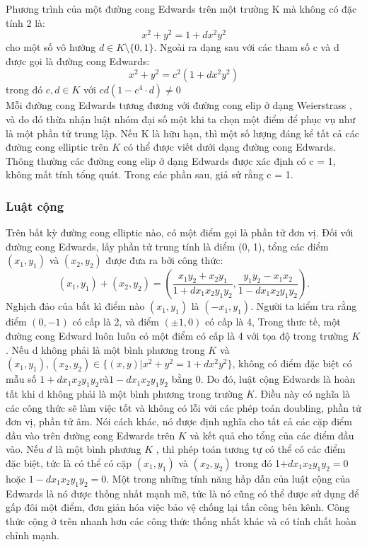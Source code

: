 \documentclass[a4paper,12pt]{report}
\begin{document}
Phương trình của một đường cong Edwards trên một trường K mà không có đặc tính 2 là:
\begin{displaymath}
x^{2}+y^{2}=1+dx^{2}y^{2}
\end{displaymath}
cho một số vô hướng  $d \in K \setminus \{0,1\}$. Ngoài ra dạng sau với các tham số c và d được gọi là đường cong Edwards:
\begin{displaymath}
x^2 + y^2 = c^2(1 + dx^2y^2)
\end{displaymath}
trong đó $c, d \in K$ với $cd(1 - c^4\cdot d) \neq 0$ \\
Mỗi đường cong Edwards tương đương với đường cong elip ở dạng Weierstrass , và do đó thừa nhận luật nhóm đại số một khi ta chọn một điểm để phục vụ như là một phần tử trung lập. Nếu K là hữu hạn, thì một số lượng đáng kể tất cả các đường cong elliptic trên $K$ có thể được viết dưới dạng đường cong Edwards. Thông thường các đường cong elip ở dạng Edwards được xác định có c = 1, không mất tính tổng quát. Trong các phần sau, giả sử rằng c = 1.
\subsubsection{Luật cộng}
Trên bất kỳ đường cong elliptic nào, có một điểm gọi là phần tử đơn vị. Đối với đường cong Edwards, lấy phần tử trung tính là điểm (0, 1), tổng các điểm $(x_1,  y_1)$ và $(x_2 ,y_2)$ được đưa ra bởi công thức:
\begin{displaymath}
(x_1, y_1) + (x_2, y_2) = \left( \frac{x_1y_2 + x_2y_1}{1 + dx_1x_2y_1y_2}, \frac{y_1y_2 - x_1x_2}{1 - dx_1x_2y_1y_2} \right).
\end{displaymath}
Nghịch đảo của bất kì điểm nào $(x_1, y_1)$ là $(-x_1, y_1)$. Người ta kiểm tra rằng điểm $(0, -1)$ có cấp là 2, và điểm $(\pm 1, 0)$ có cấp là 4, Trong thưc tế, một đường cong Edward luôn luôn có một điểm có cấp là 4 với tọa độ trong trường $K$.
Nếu d không phải là một bình phương trong $K$ và $\displaystyle (x_{1}, y_{1}), (x_{2}, y_{2}) \in \{(x, y)|x^{2} + y^{2} = 1 + dx^{2}y^{2} \}$, không có điểm đặc biệt có mẫu số $1 +  dx_1x_2y_1y_2 và 1 -  dx_1 x_2y_1y_2$ bằng 0. Do đó, luật cộng Edwards là hoàn tất khi d không phải là một bình phương trong trường $K$. Điều này có nghĩa là các công thức sẽ làm việc tốt và không có lỗi với các phép toán doubling, phần tử đơn vị, phần tử âm. Nói cách khác, nó được định nghĩa cho tất cả các cặp điểm đầu vào trên đường cong Edwards trên $K$ và kết quả cho tổng của các điểm đầu vào.
Nếu $d$ là một bình phương $K$ , thì phép toán tương tự có thể có các điểm đặc biệt, tức là có thể có cặp $(x_1, y_1)$ và $(x_2, y_2)$ trong đó 1$ +  dx_1x_2y_1y_2 = 0$ hoặc $1 -  dx_1x_2y_1y_2 = 0$.
Một trong những tính năng hấp dẫn của luật cộng của Edwards là nó được thống nhất mạnh mẽ, tức là nó cũng có thể được sử dụng để gấp đôi một điểm, đơn giản hóa việc bảo vệ chống lại tấn công bên kênh. Công thức cộng ở trên nhanh hơn các công thức thống nhất khác và có tính chất hoàn chỉnh mạnh.
\end{document}
